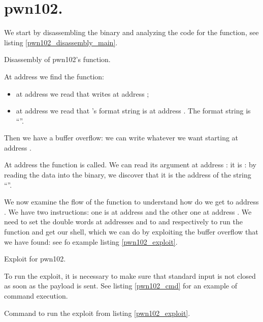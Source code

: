 \section{pwn102.}
\par We start by disassembling the binary and analyzing the code for the  function, see listing \ref{pwn102_disassembly_main}.
\begin{listing}
	
	\caption{Disassembly of pwn102's  function.}
	\label{pwn102_disassembly_main}
\end{listing}
\par At address  we find the  function:
\begin{itemize}
	\item at address  we read that  writes at address ;
	\item at address  we read that 's format string is at address . The format string is ``''.
\end{itemize}
\par Then we have a buffer overflow: we can write whatever we want starting at address .
\par At address  the function  is called. We can read its argument at address : it is : by reading the data into the binary, we discover that it is the address of the string ``''.
\par We now examine the flow of the  function to understand how do we get to address . We have two  instructions: one is at address  and the other one at address . We need to set the double words at addresses  and  to  and  respectively to run the  function and get our shell, which we can do by exploiting the buffer overflow that we have found: see fo example listing \ref{pwn102_exploit}.
\begin{listing}
	\caption{Exploit for pwn102.}
	\label{pwn102_exploit}
\end{listing}
\par To run the exploit, it is necessary to make sure that standard input is not closed as soon as the payload is sent. See listing \ref{pwn102_cmd} for an example of command execution.
\begin{listing}
	\caption{Command to run the exploit from listing \ref{pwn102_exploit}.}
	\label{pwn102_cmd}
\end{listing}
